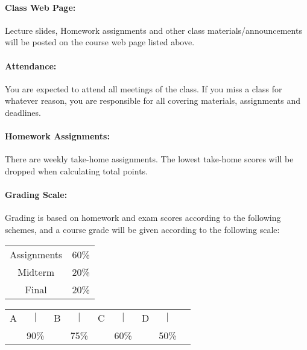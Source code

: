 \paragraph{Class Web Page:}
Lecture slides, Homework assignments and other class materials/announcements
will be posted on the course web page listed above.


\paragraph{Attendance:}
You are expected to attend all meetings of the class.
If you miss a class for whatever reason, you are responsible
for all covering materials, assignments and deadlines.


\paragraph{Homework Assignments:}
There are weekly take-home assignments. 
The lowest take-home scores will be dropped when calculating total points.


\clearpage 
\paragraph{Grading Scale:}
Grading is based on homework and exam scores according to the following schemes, and
a course grade will be given according to the following scale:
\begin{table}[!ht]
\begin{center}
\begin{tabular}{cc}
Assignments & 60\% \\
Midterm   & 20\% \\
Final     & 20\% \\
\end{tabular}
\end{center}
\end{table}

\begin{table}[!h]
  \begin{center}
    \begin{tabular}{ccccccccc}
      A & $|$  & B & $|$  & C & $|$  & D & $|$  & \\
        & 90\% &   & 75\% &   & 60\% &   & 50\% & \\
    \end{tabular}
  \end{center}
\end{table}

